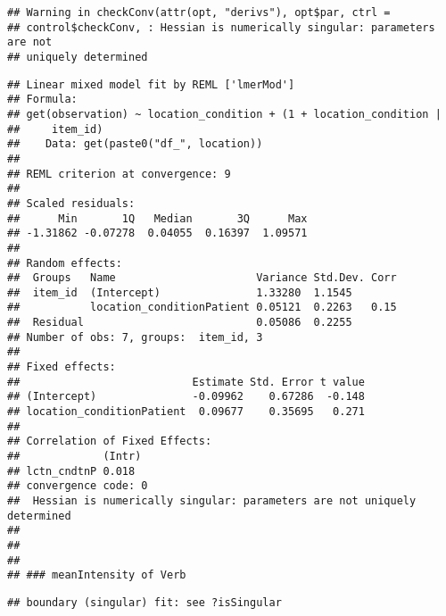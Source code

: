 \documentclass[]{article}
\begin{document}
\begin{verbatim}
## Warning in checkConv(attr(opt, "derivs"), opt$par, ctrl =
## control$checkConv, : Hessian is numerically singular: parameters are not
## uniquely determined
\end{verbatim}

\begin{verbatim}
## Linear mixed model fit by REML ['lmerMod']
## Formula: 
## get(observation) ~ location_condition + (1 + location_condition |  
##     item_id)
##    Data: get(paste0("df_", location))
## 
## REML criterion at convergence: 9
## 
## Scaled residuals: 
##      Min       1Q   Median       3Q      Max 
## -1.31862 -0.07278  0.04055  0.16397  1.09571 
## 
## Random effects:
##  Groups   Name                      Variance Std.Dev. Corr
##  item_id  (Intercept)               1.33280  1.1545       
##           location_conditionPatient 0.05121  0.2263   0.15
##  Residual                           0.05086  0.2255       
## Number of obs: 7, groups:  item_id, 3
## 
## Fixed effects:
##                           Estimate Std. Error t value
## (Intercept)               -0.09962    0.67286  -0.148
## location_conditionPatient  0.09677    0.35695   0.271
## 
## Correlation of Fixed Effects:
##             (Intr)
## lctn_cndtnP 0.018 
## convergence code: 0
##  Hessian is numerically singular: parameters are not uniquely determined
## 
##   
##   
## ### meanIntensity of Verb
\end{verbatim}

\begin{verbatim}
## boundary (singular) fit: see ?isSingular
\end{verbatim}
\end{document}
